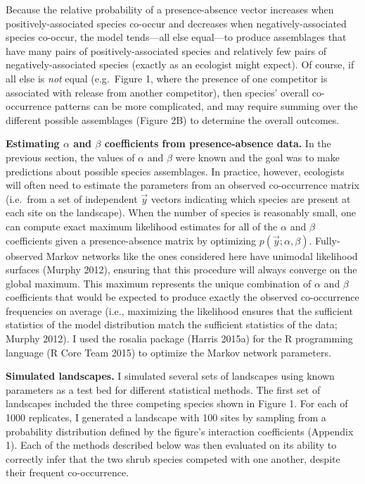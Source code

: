 \documentclass[12pt,]{article}
\begin{document}
\begin{spacing}{1.9}
\begin{flushleft}
Because the relative probability of a presence-absence vector increases
when positively-associated species co-occur and decreases when
negatively-associated species co-occur, the model tends---all else
equal---to produce assemblages that have many pairs of
positively-associated species and relatively few pairs of
negatively-associated species (exactly as an ecologist might expect). Of
course, if all else is \emph{not} equal (e.g.~Figure 1, where the
presence of one competitor is associated with release from another
competitor), then species' overall co-occurrence patterns can be more
complicated, and may require summing over the different possible
assemblages (Figure 2B) to determine the overall outcomes.

\noindent \textbf{Estimating $\alpha$ and $\beta$ coefficients from presence-absence data.}
In the previous section, the values of \(\alpha\) and \(\beta\) were
known and the goal was to make predictions about possible species
assemblages. In practice, however, ecologists will often need to
estimate the parameters from an observed co-occurrence matrix (i.e.~from
a set of independent \(\vec{y}\) vectors indicating which species are
present at each site on the landscape). When the number of species is
reasonably small, one can compute exact maximum likelihood estimates for
all of the \(\alpha\) and \(\beta\) coefficients given a
presence-absence matrix by optimizing \(p(\vec{y}; \alpha, \beta)\).
Fully-observed Markov networks like the ones considered here have
unimodal likelihood surfaces (Murphy 2012), ensuring that this procedure
will always converge on the global maximum. This maximum represents the
unique combination of \(\alpha\) and \(\beta\) coefficients that would
be expected to produce exactly the observed co-occurrence frequencies on
average (i.e., maximizing the likelihood ensures that the sufficient
statistics of the model distribution match the sufficient statistics of
the data; Murphy 2012). I used the rosalia package (Harris 2015a) for
the R programming language (R Core Team 2015) to optimize the Markov
network parameters.

\noindent \textbf{Simulated landscapes.} I simulated several sets of
landscapes using known parameters as a test bed for different
statistical methods. The first set of landscapes included the three
competing species shown in Figure 1. For each of 1000 replicates, I
generated a landscape with 100 sites by sampling from a probability
distribution defined by the figure's interaction coefficients (Appendix
1). Each of the methods described below was then evaluated on its
ability to correctly infer that the two shrub species competed with one
another, despite their frequent co-occurrence.


\end{flushleft}
\end{spacing}
\end{document}

